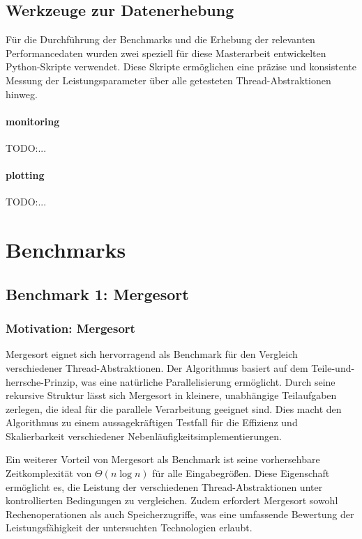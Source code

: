 \documentclass[fontsize=12pt,paper=a4,twoside=semi,parskip=half-,headsepline,headinclude]{scrreprt}
\begin{document}
\section{Werkzeuge zur Datenerhebung}

Für die Durchführung der Benchmarks und die Erhebung der relevanten Performancedaten wurden zwei speziell für diese Masterarbeit entwickelten Python-Skripte verwendet. Diese Skripte ermöglichen eine präzise und konsistente Messung der Leistungsparameter über alle getesteten Thread-Abstraktionen hinweg.

\subsubsection{monitoring}

TODO:...

\subsubsection{plotting}

TODO:...

\chapter{Benchmarks}

\section{Benchmark 1: Mergesort}

\subsection{Motivation: Mergesort}
Mergesort eignet sich hervorragend als Benchmark für den Vergleich verschiedener Thread-Abstraktionen. Der Algorithmus basiert auf dem Teile-und-herrsche-Prinzip, was eine natürliche Parallelisierung ermöglicht. Durch seine rekursive Struktur lässt sich Mergesort in kleinere, unabhängige Teilaufgaben zerlegen, die ideal für die parallele Verarbeitung geeignet sind. Dies macht den Algorithmus zu einem aussagekräftigen Testfall für die Effizienz und Skalierbarkeit verschiedener Nebenläufigkeitsimplementierungen.

Ein weiterer Vorteil von Mergesort als Benchmark ist seine vorhersehbare Zeitkomplexität von $\Theta(n\log{}n)$ für alle Eingabegrößen. Diese Eigenschaft ermöglicht es, die Leistung der verschiedenen Thread-Abstraktionen unter kontrollierten Bedingungen zu vergleichen. Zudem erfordert Mergesort sowohl Rechenoperationen als auch Speicherzugriffe, was eine umfassende Bewertung der Leistungsfähigkeit der untersuchten Technologien erlaubt.
\end{document}
